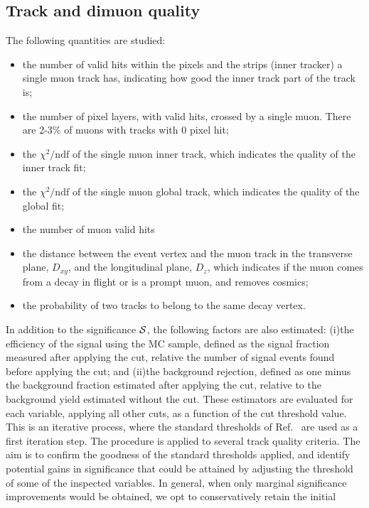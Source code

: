 \subsection{Track and dimuon quality}

The following quantities are studied:
\begin{itemize}
\item the number of valid hits within the pixels and the strips (inner tracker) a single muon track has, indicating how good the inner track part of the track is;
\item the number of pixel layers, with valid hits, crossed by a single muon. There are 2-3\% of muons with tracks with 0 pixel hit;
\item the $\chi^2/\text{ndf}$ of the single muon inner track, which indicates the quality of the inner track fit;
\item the $\chi^2/\text{ndf}$ of the single muon global track, which indicates the quality of the global fit;
\item the number of muon valid hits 
\item the distance between the event vertex and the muon track in the transverse plane, $D_{xy}$, and the longitudinal plane, $D_z$, which indicates if the muon comes from
 a decay in flight or is a prompt muon, and removes cosmics;
\item the probability of two tracks to belong to the same decay vertex.
\end{itemize}
In addition to the significance ${\cal{S}}$, the following factors are also estimated: 
(i)the efficiency of the signal using the MC sample, defined as the signal fraction measured after applying the cut, relative the number of signal events found before applying the cut; and 
(ii)the background rejection, 
defined as one minus the background fraction estimated after applying the cut, relative to the background yield estimated without the cut.
These estimators are evaluated for each variable, applying all other cuts, as a function of the cut threshold value. 
This is an iterative process, where the standard thresholds of Ref.~\cite{CMS_AN_2011_062} are used as a first iteration step. 
The procedure is applied to several track quality criteria. The aim is to confirm the goodness of the standard thresholds applied, and identify potential gains in significance that could be 
attained by adjusting the threshold of some of the inspected variables. In general, when only marginal significance improvements would be obtained, we opt to conservatively retain the initial 
